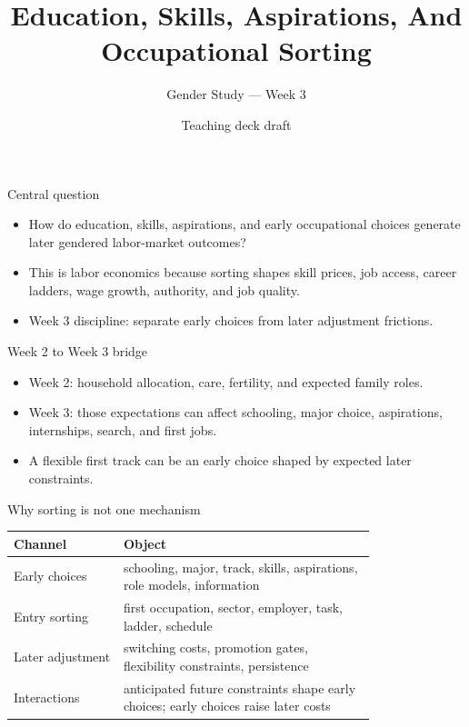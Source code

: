 \documentclass[aspectratio=169,11pt]{beamer}
\title{Education, Skills, Aspirations, And Occupational Sorting}
\subtitle{Gender Study --- Week 3}
\author{Teaching deck draft}
\date{}
\begin{document}
\begin{frame}
  \titlepage
\end{frame}

\begin{frame}{Central question}
\begin{itemize}
    \item How do education, skills, aspirations, and early occupational choices generate later gendered labor-market outcomes?
    \item This is labor economics because sorting shapes skill prices, job access, career ladders, wage growth, authority, and job quality.
    \item Week 3 discipline: separate early choices from later adjustment frictions.
\end{itemize}
\end{frame}

\begin{frame}{Week 2 to Week 3 bridge}
\begin{itemize}
    \item Week 2: household allocation, care, fertility, and expected family roles.
    \item Week 3: those expectations can affect schooling, major choice, aspirations, internships, search, and first jobs.
    \item A flexible first track can be an early choice shaped by expected later constraints.
\end{itemize}
\end{frame}

\begin{frame}{Why sorting is not one mechanism}
\small
\begin{tabular}{p{0.24\linewidth} p{0.55\linewidth}}
\toprule
Channel & Object \\
\midrule
Early choices & schooling, major, track, skills, aspirations, role models, information \\
Entry sorting & first occupation, sector, employer, task, ladder, schedule \\
Later adjustment & switching costs, promotion gates, flexibility constraints, persistence \\
Interactions & anticipated future constraints shape early choices; early choices raise later costs \\
\bottomrule
\end{tabular}
\end{frame}
\end{document}
